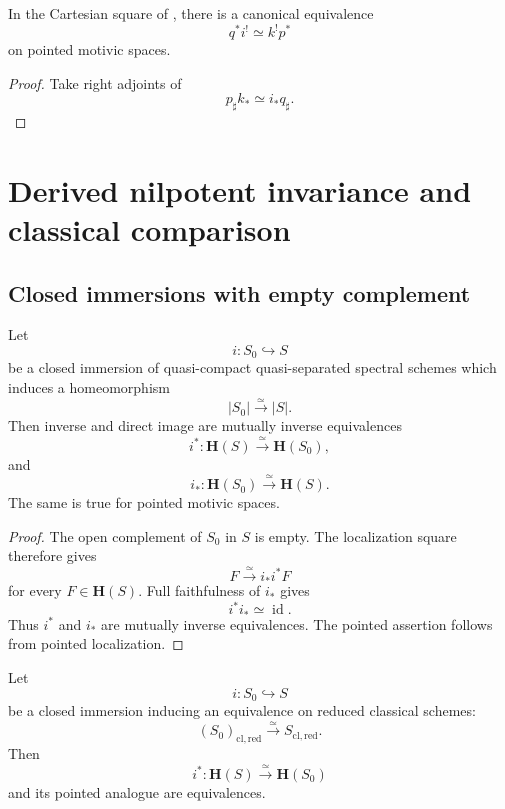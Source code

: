 \begin{corollary}
\label{cor:exceptional-smooth-closed-exchange}
In the Cartesian square of
,
there is a canonical equivalence
\[
    q^*i^!
    \simeq
    k^!p^*
\]
on pointed motivic spaces.
\end{corollary}

\begin{proof}
Take right adjoints of
\[
    p_\sharp k_*
    \simeq
    i_*q_\sharp.
\]
\end{proof}

\section{Derived nilpotent invariance and classical comparison}
\label{sec:derived-nilpotent-invariance-classical-comparison}

\subsection{Closed immersions with empty complement}

\begin{theorem}
\label{thm:topological-invariance-closed-immersion}
Let
\[
    i
    \colon
    S_0
    \hookrightarrow
    S
\]
be a closed immersion of quasi-compact quasi-separated spectral schemes
which induces a homeomorphism
\[
    |S_0|
    \xrightarrow{\simeq}
    |S|.
\]
Then inverse and direct image are mutually inverse equivalences
\[
    i^*
    \colon
    \mathbf H(S)
    \xrightarrow{\simeq}
    \mathbf H(S_0),
\]
and
\[
    i_*
    \colon
    \mathbf H(S_0)
    \xrightarrow{\simeq}
    \mathbf H(S).
\]
The same is true for pointed motivic spaces.
\end{theorem}

\begin{proof}
The open complement of \(S_0\) in \(S\) is empty.  The localization
square therefore gives
\[
    F
    \xrightarrow{\simeq}
    i_*i^*F
\]
for every \(F\in\mathbf H(S)\).  Full faithfulness of \(i_*\) gives
\[
    i^*i_*
    \simeq
    \operatorname{id}.
\]
Thus \(i^*\) and \(i_*\) are mutually inverse equivalences.  The
pointed assertion follows from pointed localization.
\end{proof}

\begin{corollary}
\label{cor:invariance-equal-reduced-structure}
Let
\[
    i
    \colon
    S_0
    \hookrightarrow
    S
\]
be a closed immersion inducing an equivalence on reduced classical
schemes:
\[
    (S_0)_{\mathrm{cl,red}}
    \xrightarrow{\simeq}
    S_{\mathrm{cl,red}}.
\]
Then
\[
    i^*
    \colon
    \mathbf H(S)
    \xrightarrow{\simeq}
    \mathbf H(S_0)
\]
and its pointed analogue are equivalences.
\end{corollary}


